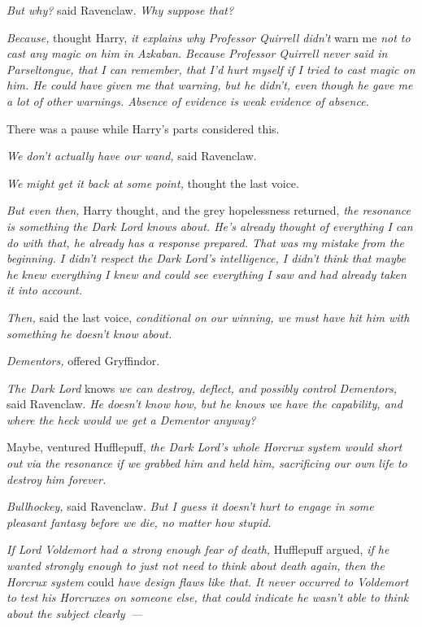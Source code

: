 \emph{But why?} said Ravenclaw. \emph{Why suppose that?}

\emph{Because,} thought Harry, \emph{it explains why Professor Quirrell didn't}
warn me \emph{not to cast any magic on him in Azkaban. Because Professor
Quirrell never said in Parseltongue, that I can remember, that I'd hurt myself
if I tried to cast magic on him. He could have given me that warning, but he
didn't, even though he gave me a lot of other warnings. Absence of evidence is
weak evidence of absence.}

There was a pause while Harry's parts considered this.

\emph{We don't actually have our wand,} said Ravenclaw.

\emph{We might get it back at some point,} thought the last voice.

\emph{But even then,} Harry thought, and the grey hopelessness returned,
\emph{the resonance is something the Dark Lord knows about. He's already
thought of everything I can do with that, he already has a response prepared.
That was my mistake from the beginning. I didn't respect the Dark Lord's
intelligence, I didn't think that maybe he knew everything I knew and could see
everything I saw and had already taken it into account.}

\emph{Then,} said the last voice, \emph{conditional on our winning, we must
have hit him with something he doesn't know about.}

\emph{Dementors,} offered Gryffindor.

\emph{The Dark Lord} knows \emph{we can destroy, deflect, and possibly control
Dementors,} said Ravenclaw. \emph{He doesn't know how, but he knows we have the
capability, and where the heck would we get a Dementor anyway?}

Maybe, ventured Hufflepuff, \emph{the Dark Lord's whole Horcrux system would
short out via the resonance if we grabbed him and held him, sacrificing our own
life to destroy him forever.}

\emph{Bullhockey,} said Ravenclaw. \emph{But I guess it doesn't hurt to engage
in some pleasant fantasy before we die, no matter how stupid.}

\emph{If Lord Voldemort had a strong enough fear of death,} Hufflepuff argued,
\emph{if he wanted strongly enough to just not need to think about death again,
then the Horcrux system} could \emph{have design flaws like that. It never
occurred to Voldemort to test his Horcruxes on someone else, that could
indicate he wasn't able to think about the subject clearly~--- }

